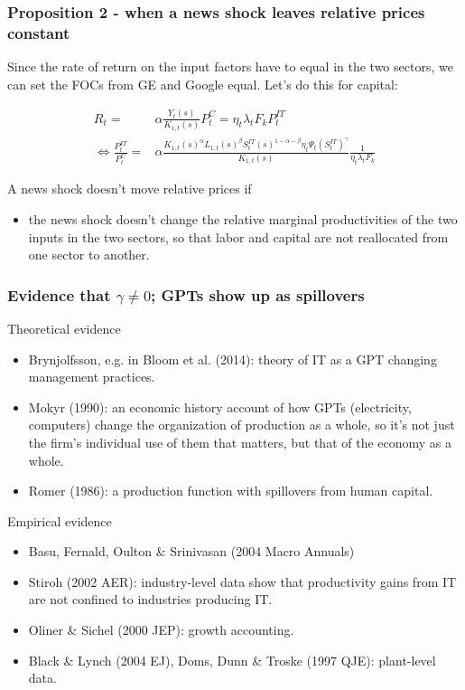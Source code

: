 \documentclass{beamer}
\begin{document}
\begin{frame}
\frametitle{Proposition 2 - when a news shock leaves relative prices constant}

Since the rate of return on the input factors have to equal in the two sectors, we can set the FOCs from GE and Google equal. Let's do this for capital:

\begin{align*}
R_t = & \alpha \frac{Y_t(s)}{K_{1,t}(s)} P^C_t = \eta_t \lambda_t F_k P^{IT}_t \\
\Leftrightarrow \frac{P^{IT}_t }{P^{C}_t } = & \alpha \frac{K_{1,t}(s)^{\alpha}L_{1,t}(s)^{\beta}S^{IT}_t(s)^{1-\alpha - \beta}\eta_t \Psi_t (S^{IT}_t)^{\gamma} }{K_{1,t}(s)} \frac{1}{\eta_t \lambda_t F_k}
\end{align*}


A news shock doesn't move relative prices if 
\begin{itemize}
\item the news shock doesn't change the relative marginal productivities of the two inputs in the two sectors, so that labor and capital are not reallocated from one sector to another.
\end{itemize}

\end{frame}

\begin{frame}
\frametitle{Evidence that $\gamma \neq 0$; GPTs show up as spillovers}

Theoretical evidence
\begin{itemize}
\item Brynjolfsson, e.g. in Bloom et al. (2014): theory of IT as a GPT changing management practices.
\item Mokyr (1990):  an economic history account of how GPTs (electricity, computers) change the organization of production as a whole, so it's not just the firm's individual use of them that matters, but that of the economy as a whole.
\item Romer (1986): a production function with spillovers from human capital.
\end{itemize}

Empirical evidence
\begin{itemize}
\item Basu, Fernald, Oulton \& Srinivasan (2004 Macro Annuals)
\item Stiroh (2002 AER): industry-level data show that productivity gains from IT are not confined to industries producing IT.
\item Oliner \& Sichel (2000 JEP): growth accounting.
\item Black \& Lynch (2004 EJ), Doms, Dunn \& Troske (1997 QJE): plant-level data.
\end{itemize}

\end{frame}
\end{document}
